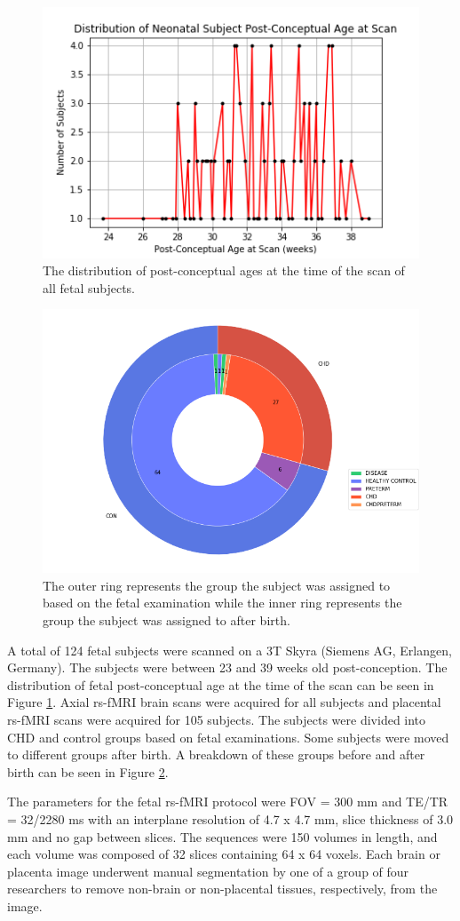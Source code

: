 \begin{figure}
\centering
\includegraphics[width=.6\textwidth]{5/demo_fetal_scan_pca.png}
\caption{The distribution of post-conceptual ages at the time of the scan of all fetal subjects.}
\label{ch5:fetal:scanpca}
\end{figure}

\begin{figure}
\centering
\includegraphics[width=.6\textwidth]{5/demo_fetal_subj_cohort.png}
\caption{The outer ring represents the group the subject was assigned to based on the fetal examination while the inner ring represents the group the subject was assigned to after birth.}
\label{ch5:fetal:cohort}
\end{figure}

A total of 124 fetal subjects were scanned on a 3T Skyra (Siemens AG, Erlangen, Germany). The subjects were between 23 and 39 weeks old post-conception. The distribution of fetal post-conceptual age at the time of the scan can be seen in Figure \ref{ch5:fetal:scanpca}. Axial rs-fMRI brain scans were acquired for all subjects and placental rs-fMRI scans were acquired for 105 subjects. The subjects were divided into CHD and control groups based on fetal examinations. Some subjects were moved to different groups after birth. A breakdown of these groups before and after birth can be seen in Figure \ref{ch5:fetal:cohort}.

The parameters for the fetal rs-fMRI protocol were FOV = 300 mm and TE/TR = 32/2280 ms with an interplane resolution of 4.7 x 4.7 mm, slice thickness of 3.0 mm and no gap between slices. The sequences were 150 volumes in length, and each volume was composed of 32 slices containing 64 x 64 voxels. Each brain or placenta image underwent manual segmentation by one of a group of four researchers to remove non-brain or non-placental tissues, respectively, from the image. 


